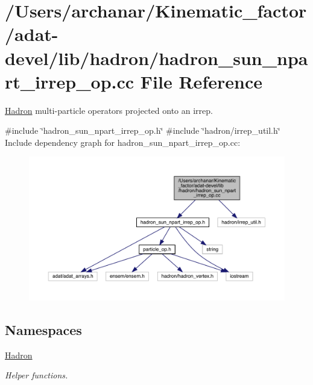 \hypertarget{adat-devel_2lib_2hadron_2hadron__sun__npart__irrep__op_8cc}{}\section{/\+Users/archanar/\+Kinematic\+\_\+factor/adat-\/devel/lib/hadron/hadron\+\_\+sun\+\_\+npart\+\_\+irrep\+\_\+op.cc File Reference}
\label{adat-devel_2lib_2hadron_2hadron__sun__npart__irrep__op_8cc}


\mbox{\hyperlink{namespaceHadron}{Hadron}} multi-\/particle operators projected onto an irrep.  


{\ttfamily \#include \char`\"{}hadron\+\_\+sun\+\_\+npart\+\_\+irrep\+\_\+op.\+h\char`\"{}}\newline
{\ttfamily \#include \char`\"{}hadron/irrep\+\_\+util.\+h\char`\"{}}\newline
Include dependency graph for hadron\+\_\+sun\+\_\+npart\+\_\+irrep\+\_\+op.\+cc\+:
\nopagebreak
\begin{figure}[H]
\begin{center}
\leavevmode
\includegraphics[width=350pt]{d9/dd9/adat-devel_2lib_2hadron_2hadron__sun__npart__irrep__op_8cc__incl}
\end{center}
\end{figure}
\subsection*{Namespaces}
\begin{DoxyCompactItemize}
\item 
 \mbox{\hyperlink{namespaceHadron}{Hadron}}
\begin{DoxyCompactList}\small\item\em Helper functions. \end{DoxyCompactList}\end{DoxyCompactItemize}
